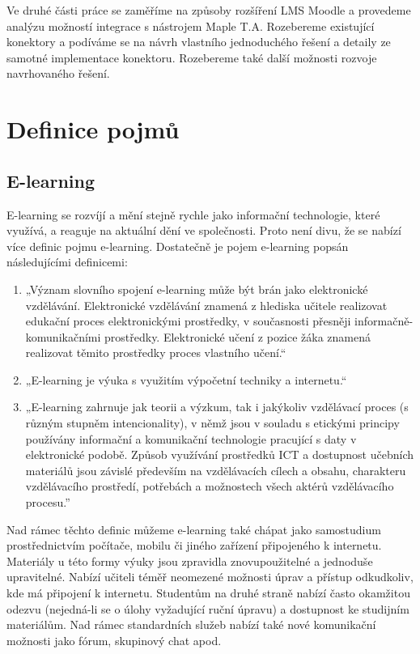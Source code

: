 \documentclass[
print,
  11pt,
  table,   
  nolof,    
  nolot,
  oneside,
  final
]{fithesis3}
\begin{document}
Ve druhé části práce se zaměříme na způsoby rozšíření LMS Moodle a provedeme analýzu možností integrace s nástrojem Maple T.A. Rozebereme existující konektory a podíváme se na návrh vlastního jednoduchého řešení a detaily ze samotné implementace konektoru. Rozebereme také další možnosti rozvoje navrhovaného řešení.


\chapter{Definice pojmů}
	\section{E-learning}
E-learning se rozvíjí a mění stejně rychle jako informační technologie, které využívá, a reaguje na aktuální dění ve společnosti. Proto není divu, že se nabízí více definic pojmu e-learning. Dostatečně je pojem e-learning popsán následujícími definicemi:

\begin{enumerate}
  \item „Význam slovního spojení e-learning může být brán jako elektronické vzdělávání. Elektronické vzdělávání znamená z hlediska učitele realizovat edukační proces elektronickými prostředky, v současnosti přesněji informačně-komunikačními prostředky. Elektronické učení z pozice žáka znamená realizovat těmito prostředky proces vlastního učení.“ \cite{ockajova}
  \item „E-learning je výuka s využitím výpočetní techniky a internetu.“ \cite{korviny}
  \item „E-learning zahrnuje jak teorii a výzkum, tak i jakýkoliv vzdělávací proces (s různým stupněm intencionality), v němž jsou v souladu s etickými principy používány informační a komunikační technologie pracující s daty v elektronické podobě. Způsob využívání prostředků ICT a dostupnost učebních materiálů jsou závislé především na vzdělávacích cílech a obsahu, charakteru vzdělávacího prostředí, potřebách a možnostech všech aktérů vzdělávacího procesu.” \cite{zounek}

\end{enumerate}


Nad rámec těchto definic můžeme e-learning také chápat jako samostudium prostřednictvím počítače, mobilu či jiného zařízení připojeného k internetu. Materiály u této formy výuky jsou zpravidla znovupoužitelné a jednoduše upravitelné. Nabízí učiteli téměř neomezené možnosti úprav a přístup odkudkoliv, kde má připojení k internetu. Studentům na druhé straně nabízí často okamžitou odezvu (nejedná-li se o úlohy vyžadující ruční úpravu) a dostupnost ke studijním materiálům. Nad rámec standardních služeb nabízí také nové komunikační možnosti jako fórum, skupinový chat apod.
\end{document}
